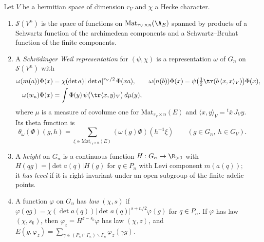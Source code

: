 \begin{definition}\label{pf:liftinj:schrdef}
Let $V$ be a hermitian space of dimension $r_V$ and $\chi$ a Hecke character.
\begin{enumerate}[label=(\alph*)]
\item $\mathcal S(V^n)$ is the space of functions on $\mathrm{Mat}_{r_V\times n}(\A_E)$ spanned by products of a Schwartz function of the
archimedean components and a Schwartz--Bruhat function of the finite components.
\item A \emph{Schr\"odinger Weil representation} for $(\psi,\chi)$ is a representation $\omega$ of $G_n$ on $\mathcal S(V^n)$ with
\begin{equation}\label{eq:pf:liftinj:schr}
\begin{aligned}
\omega(m(a))\Phi(x)&=\chi(\det a)\,|\det a|^{r_V/2}\,\Phi(xa),\qquad
\omega(n(b))\Phi(x)=\psi\bigl(\tfrac12\tr(b\,\langle x,x\rangle_V)\bigr)\Phi(x),\\
\omega(w_n)\Phi(x)&=\int\Phi(y)\,\psi\bigl(\tr\langle x,y\rangle_V\bigr)\,d\mu(y),
\end{aligned}
\end{equation}
where $\mu$ is a measure of covolume one for $\mathrm{Mat}_{r_V\times n}(E)$ and $\langle x,y\rangle_V={}^t\bar x\,J_Vy$. Its theta function is
\begin{equation}\label{eq:pf:liftinj:thetaS}
\theta_\omega(\Phi)(g,h)=\sum_{\xi\in\mathrm{Mat}_{r_V\times n}(E)}(\omega(g)\Phi)(h^{-1}\xi)\qquad(g\in G_n,\ h\in G_V).
\end{equation}
\item A \emph{height} on $G_n$ is a continuous function $H:G_n\to\R_{>0}$ with $H(qg)=|\det a(q)|H(g)$ for $q\in P_n$ with Levi component
$m(a(q))$; it \emph{has level} if it is right invariant under an open subgroup of the finite adelic points.
\item A function $\varphi$ on $G_n$ has \emph{law $(\chi,s)$} if $\varphi(qg)=\chi(\det a(q))|\det a(q)|^{s+n/2}\varphi(g)$ for $q\in P_n$. If
$\varphi$ has law $(\chi,s_0)$, then $\varphi_z=H^{z-s_0}\varphi$ has law $(\chi,z)$, and
$E(g,\varphi_z)=\sum_{\gamma\in(P_n\cap\Gamma_n)\backslash\Gamma_n}\varphi_z(\gamma g)$.
\end{enumerate}
\end{definition}

